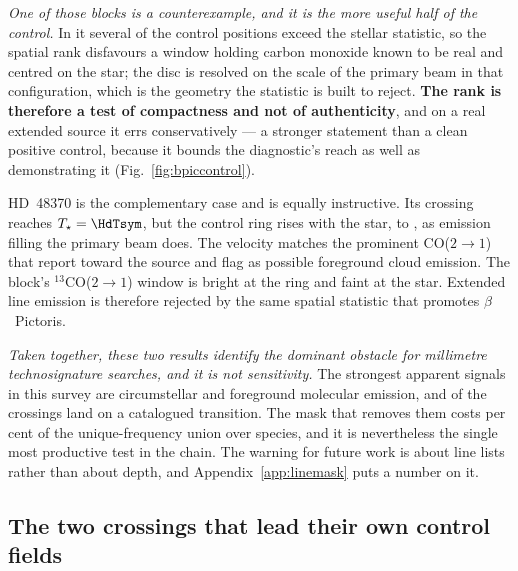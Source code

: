 \emph{One of those blocks is a counterexample, and it is the more useful half
of the control.} In it several of the \NCtrl{} control positions exceed the
stellar statistic, so the spatial rank disfavours a window holding carbon
monoxide known to be real and centred on the star; the disc is resolved on
the scale of the primary beam in that configuration, which is the geometry
the statistic is built to reject. \textbf{The rank is therefore a test of
compactness and not of authenticity}, and on a real extended source it errs
conservatively --- a stronger statement than a clean positive control, because
it bounds the diagnostic's reach as well as demonstrating it
(Fig.~\ref{fig:bpiccontrol}).



HD~48370 is the complementary case and is equally instructive. Its crossing
reaches $T_\star=\HdTsym$, but the control ring rises with the star, to
\HdRingMax, as emission filling the primary beam does. The velocity matches
the prominent CO($2{\to}1$) that \citet{Cataldi2023} report toward the
source and flag as possible foreground cloud emission. The block's
$^{13}$CO($2{\to}1$) window is bright at the ring and faint at the star.
Extended line emission is therefore rejected by the same spatial statistic
that promotes $\beta$~Pictoris.

\emph{Taken together, these two results identify the dominant obstacle for
millimetre technosignature searches, and it is not sensitivity.} The
strongest apparent signals in this survey are circumstellar and foreground
molecular emission, and \NAttributed{} of the \NCross{} crossings land on a
catalogued transition. The mask that removes them costs \FrMaskPct{} per
cent of the unique-frequency union over \FrNSpec{} species, and it is
nevertheless the single most productive test in the chain. The warning for
future work is about line lists rather than about depth, and
Appendix~\ref{app:linemask} puts a number on it.

\subsection{The two crossings that lead their own control fields}
\label{sec:vistest}

